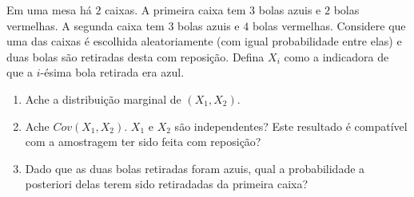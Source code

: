 \begin{exercise}
 Em uma mesa há $2$ caixas.
 A primeira caixa tem
 $3$ bolas azuis e $2$ bolas vermelhas.
 A segunda caixa tem
 $3$ bolas azuis e $4$ bolas vermelhas.
 Considere que uma das caixas é escolhida aleatoriamente
 (com igual probabilidade entre elas) e 
 duas bolas são retiradas desta com reposição.
 Defina $X_{i}$ como a indicadora de que
 a $i$-ésima bola retirada era azul.
 \begin{enumerate}[label=(\alph*)]
  \item Ache a distribuição marginal de
  $(X_{1},X_{2})$.
  \item Ache $Cov(X_{1},X_{2})$.
  $X_{1}$ e $X_{2}$ são independentes?
  Este resultado é compatível com
  a amostragem ter sido feita com reposição?
  \item Dado que as duas bolas retiradas foram azuis,
  qual a probabilidade a posteriori delas terem sido retiradadas da primeira caixa?
 \end{enumerate}
\end{exercise}


